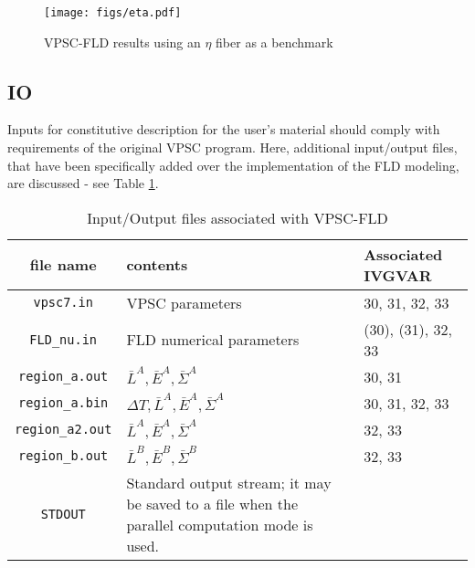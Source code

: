 \documentclass[12pt]{amsart}
\begin{document}
\begin{figure}%
  \texttt{[image: figs/eta.pdf]}
  \caption{VPSC-FLD results using an $\eta$ fiber as a benchmark}
  \label{fig:eta_da_bm}
\end{figure}

\newpage

\subsection{IO}
\label{sec:IO}
Inputs for constitutive description for the user's material should comply with requirements of the original VPSC program.
Here, additional input/output files, that have been specifically added over the implementation of the FLD modeling, are discussed - see Table \ref{tab:io}.
\begin{table}[b]
  \caption{Input/Output files associated with VPSC-FLD}
  \label{tab:io}
  \begin{tabular}{c | p{7cm} | l}
    file name            & contents                                                                                                   & Associated IVGVAR\\
    \hline
    \verb$vpsc7.in$      & VPSC parameters                                                                        & 30, 31, 32, 33\\
    \verb$FLD_nu.in$     & FLD numerical parameters                                                               & (30), (31), 32, 33\\
    \hline
    \verb$region_a.out$  & $\bar{L}^{A}, \bar{E}^{A}, \bar{\Sigma}^{A}$                                                             & 30, 31\\
    \verb$region_a.bin$  & $\Delta{T}, \bar{L}^{A}, \bar{E}^{A}, \bar{\Sigma}^{A}$      & 30, 31, 32, 33\\
    \verb$region_a2.out$ & $\bar{L}^{A}, \bar{E}^{A}, \bar{\Sigma}^{A}$                                                                                               & 32, 33 \\
    \verb$region_b.out$  & $\bar{L}^{B}, \bar{E}^{B}, \bar{\Sigma}^{B}$                                                             & 32, 33\\
    \hline
    \verb$STDOUT$        & Standard output stream; it may be saved to a file when the parallel computation mode is used.&
  \end{tabular}
\end{table}
\end{document}
